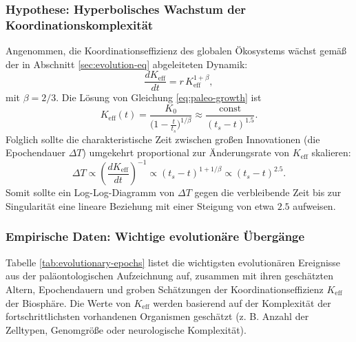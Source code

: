 \documentclass[12pt,a4paper]{article}
\theoremstyle{remark}
\begin{document}
	\subsubsection{Hypothese: Hyperbolisches Wachstum der Koordinationskomplexität}
	
	Angenommen, die Koordinationseffizienz des globalen Ökosystems wächst gemäß der in Abschnitt \ref{sec:evolution-eq} abgeleiteten Dynamik:
	\begin{equation}
		\frac{dK_{\mathrm{eff}}}{dt} = r \, K_{\mathrm{eff}}^{1+\beta},
		\label{eq:paleo-growth}
	\end{equation}
	mit $\beta = 2/3$. Die Lösung von Gleichung \eqref{eq:paleo-growth} ist
	\begin{equation}
		K_{\mathrm{eff}}(t) = \frac{K_0}{\bigl(1 - \frac{t}{t_s}\bigr)^{1/\beta}} \approx \frac{\text{const}}{(t_s - t)^{1.5}}.
		\label{eq:paleo-keff}
	\end{equation}
	Folglich sollte die charakteristische Zeit zwischen großen Innovationen (die Epochendauer $\Delta T$) umgekehrt proportional zur Änderungsrate von $K_{\mathrm{eff}}$ skalieren:
	\begin{equation}
		\Delta T \propto \left( \frac{dK_{\mathrm{eff}}}{dt} \right)^{-1} \propto (t_s - t)^{1 + 1/\beta} \propto (t_s - t)^{2.5}.
		\label{eq:paleo-dT}
	\end{equation}
	Somit sollte ein Log-Log-Diagramm von $\Delta T$ gegen die verbleibende Zeit bis zur Singularität eine lineare Beziehung mit einer Steigung von etwa $2.5$ aufweisen.
	
	\subsubsection{Empirische Daten: Wichtige evolutionäre Übergänge}
	
	Tabelle \ref{tab:evolutionary-epochs} listet die wichtigsten evolutionären Ereignisse aus der paläontologischen Aufzeichnung auf, zusammen mit ihren geschätzten Altern, Epochendauern und groben Schätzungen der Koordinationseffizienz $K_{\mathrm{eff}}$ der Biosphäre. Die Werte von $K_{\mathrm{eff}}$ werden basierend auf der Komplexität der fortschrittlichsten vorhandenen Organismen geschätzt (z. B. Anzahl der Zelltypen, Genomgröße oder neurologische Komplexität).
	
\end{document}
